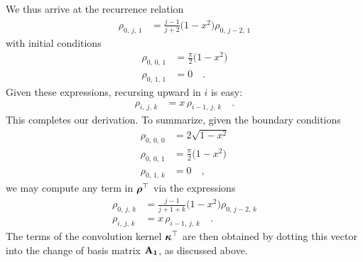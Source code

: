 \documentclass[modern]{aastex62}
\begin{document}
%
We thus arrive at the recurrence relation
%
\begin{align}
    \rho_{0,\,j,\,1} &= \frac{j - 1}{j + 2} \big(1 - x^2\big) \rho_{0,\,j-2,\,1}
\end{align}
%
with initial conditions
%
\begin{align}
    \rho_{0,\,0,\,1} &= \frac{\pi}{2} \big(1-x^2\big) \nonumber \\
    \rho_{0,\,1,\,1} &= 0 \quad.
\end{align}
%
Given these expressions, recursing upward in $i$ is easy:
%
\begin{align}
    \rho_{i,\,j,\,k} &= x \, \rho_{i-1,\,j,\,k} \quad.
\end{align}
%
This completes our derivation. To summarize, given the boundary conditions
%
\begin{align}
    \rho_{0,\,0,\,0} &= 2 \sqrt{1-x^2} \nonumber \\
    \rho_{0,\,0,\,1} &= \frac{\pi}{2} \big(1-x^2\big) \nonumber \\
    \rho_{0,\,1,\,k} &= 0 \quad ,
\end{align}
%
we may compute any term in $\boldsymbol{\rho}^\top$ via the expressions
%
\begin{align}
    \label{eq:kT:sTrecurrence}
    \rho_{0,\,j,\,k} &= \frac{j - 1}{j + 1 + k} \big(1 - x^2\big) \rho_{0,\,j-2,\,k} \nonumber \\
    \rho_{i,\,j,\,k} &= x \, \rho_{i-1,\,j,\,k} \quad.
\end{align}
%
The terms of the convolution kernel $\boldsymbol{\kappa}^\top$ are then obtained by dotting
this vector into the change of basis matrix ${\mathbf{A_1}}$, as discussed above.
\end{document}
